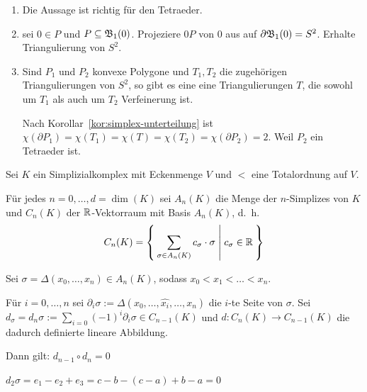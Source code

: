 \begin{beweis}\leavevmode
    \begin{enumerate}[label=\arabic*)]
        \item Die Aussage ist richtig für den Tetraeder.
        \item \Obda{} sei $0 \in P$ und $P \subseteq \mathfrak{B}_1(0)$. Projeziere
              $0P$ von $0$ aus auf $\partial \mathfrak{B}_1(0) = S^2$.
              Erhalte Triangulierung von $S^2$.

        \item Sind $P_1$ und $P_2$ konvexe Polygone und $T_1, T_2$
              die zugehörigen Triangulierungen von $S^2$, so gibt es 
              eine eine Triangulierungen $T$, die sowohl um $T_1$ als
              auch um $T_2$ Verfeinerung ist.


              Nach Korollar~\ref{kor:simplex-unterteilung} ist
              $\chi(\partial P_1) = \chi(T_1) = \chi(T) = \chi(T_2) = \chi(\partial P_2) = 2$.
              Weil \obda{} $P_2$ ein Tetraeder ist.
    \end{enumerate}
\end{beweis}

\begin{korollar}
    Sei $K$ ein  Simplizialkomplex mit Eckenmenge $V$
    und $<$ eine Totalordnung auf $V$.

    Für jedes $n=0, \dots, d=\dim(K)$ sei $A_n(K)$ die Menge der
    $n$-Simplizes von $K$ und $C_n(K)$ der $\mathbb{R}$-Vektorraum mit
    Basis $A_n(K)$, d.~h.
    \[C_n(K) = \Set{\sum_{\sigma \in A_n(K)} c_\sigma \cdot \sigma | c_\sigma \in \ensuremath{\mathbb{R}}}\]

    Sei $\sigma = \Delta(x_0, \dots, x_n) \in A_n(K)$, sodass 
    $x_0 < x_1 < \dots < x_n$.

    Für $i = 0, \dots, n$ sei $\partial_i \sigma := \Delta(x_0, \dots, \hat{x_i}, \dots, x_n)$
    die $i$-te Seite von $\sigma$. Sei $d_\sigma = d_n \sigma := \sum_{i=0} (-1)^i \partial_i \sigma \in C_{n-1} (K)$
    und $d: C_n(K) \rightarrow C_{n-1}(K)$ die dadurch definierte lineare
    Abbildung.

    Dann gilt: $d_{n-1} \circ d_n = 0$


    $d_2 \sigma = e_1 - e_2 + e_3 = c - b - (c-a) + b - a = 0$
\end{korollar}


